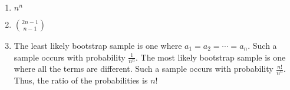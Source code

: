 \begin{enumerate}[label=(\alph*)]
\item $n^{n}$

\item $\binom{2n-1}{n-1}$

\item The least likely bootstrap sample is one where $a_{1} = a_{2} = \cdots = a_{n}$. Such a sample occurs with probability $\frac{1}{n^{n}}$. The most likely bootstrap sample is one where all the terms are different. Such a sample occurs with probability $\frac{n!}{n^{n}}$. Thus, the ratio of the probabilities is $n!$
\end{enumerate}